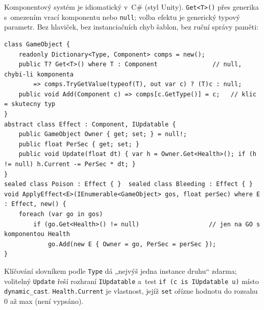 \medskip
\begin{csalt}
Komponentový systém je idiomatický v~C\# (styl Unity). \texttt{Get<T>()} přes generika
s~omezením vrací komponentu nebo \texttt{null}; volba efektu je generický typový parametr.
Bez hlaviček, bez instanciačních chyb šablon, bez ruční správy paměti:
\begin{lstlisting}[style=cs]
class GameObject {
    readonly Dictionary<Type, Component> comps = new();
    public T? Get<T>() where T : Component               // null, chybi-li komponenta
        => comps.TryGetValue(typeof(T), out var c) ? (T)c : null;
    public void Add(Component c) => comps[c.GetType()] = c;   // klic = skutecny typ
}
abstract class Effect : Component, IUpdatable {
    public GameObject Owner { get; set; } = null!;
    public float PerSec { get; set; }
    public void Update(float dt) { var h = Owner.Get<Health>(); if (h != null) h.Current -= PerSec * dt; }
}
sealed class Poison : Effect { }  sealed class Bleeding : Effect { }
void ApplyEffect<E>(IEnumerable<GameObject> gos, float perSec) where E : Effect, new() {
    foreach (var go in gos)
        if (go.Get<Health>() != null)                   // jen na GO s komponentou Health
            go.Add(new E { Owner = go, PerSec = perSec });
}
\end{lstlisting}
Klíčování slovníkem podle \texttt{Type} dá „nejvýš jedna instance druhu`` zdarma; volitelný
\texttt{Update} řeší rozhraní \texttt{IUpdatable} a~test \texttt{if (c is IUpdatable u)} místo \texttt{dynamic\_cast}.
\texttt{Health.Current} je vlastnost, jejíž \texttt{set} ořízne hodnotu do rozsahu 0 až max (není vypsáno).
\end{csalt}
